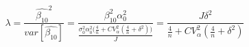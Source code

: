 \begin{equation}
\label{eq:lambda}
\lambda = \frac{\hat{\beta_{10}}^2}{var[\hat{\beta_{10}}]} = \frac{\beta_{10}^2\alpha_0^2}{\frac{\sigma_0^2\alpha_0^2\Big(\frac{4}{n} + CV_{\alpha}^2(\frac{4}{n} + \delta^2)\Big)}{J}} = \frac{J\delta^2}{\frac{4}{n}+CV_{\alpha}^2(\frac{4}{n} + \delta^2)}
\end{equation}